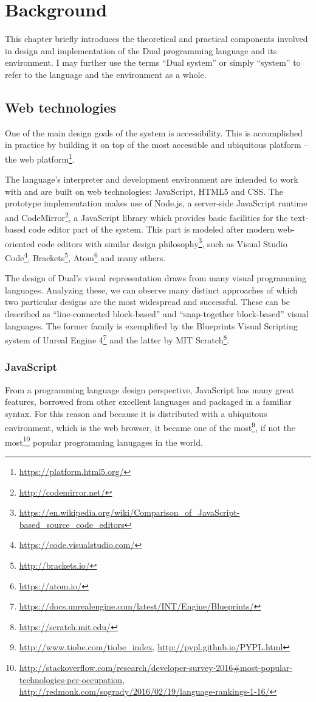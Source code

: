 \chapter{Background}\label{chap:background}
This chapter briefly introduces the theoretical and practical components
involved in design and implementation of the Dual programming language and its
environment. I may further use the terms ``Dual system'' or simply ``system'' to
refer to the language and the environment as a whole.

\section{Web technologies}
One of the main design goals of the system is accessibility. This is
accomplished in practice by building it on top of the most accessible and
ubiquitous platform -- the web
platform\footnote{\url{https://platform.html5.org/}}.

The language's interpreter and development environment are intended to work with
and are built on web technologies: JavaScript, HTML5 and CSS. The prototype
implementation makes use of Node.js, a server-side JavaScript runtime and
CodeMirror\footnote{\url{http://codemirror.net/}}, a JavaScript library which
provides basic facilities for the text-based code editor part of the
system. This part is modeled after modern web-oriented code editors with similar
design
philosophy\footnote{\url{https://en.wikipedia.org/wiki/Comparison_of_JavaScript-based_source_code_editors}},
such as Visual Studio Code\footnote{\url{https://code.visualstudio.com/}},
Brackets\footnote{\url{http://brackets.io/}},
Atom\footnote{\url{https://atom.io/}} and many others.

The design of Dual's visual representation draws from many visual programming
languages. Analyzing these, we can observe many distinct approaches of which two
particular designs are the most widespread and successful. These can be
described as ``line-connected block-based'' and ``snap-together block-based''
visual languages. The former family is exemplified by the Blueprints Visual
Scripting system of Unreal Engine
4\footnote{\url{https://docs.unrealengine.com/latest/INT/Engine/Blueprints/}}
and the latter by MIT Scratch\footnote{\url{https://scratch.mit.edu/}}.

\subsection{JavaScript}
From a programming language design perspective, JavaScript has many great
features, borrowed from other excellent languages and packaged in a familiar
syntax. For this reason and because it is distributed with a ubiquitous
environment, which is the web browser, it became one of the
most\footnote{\url{http://www.tiobe.com/tiobe_index},
  \url{http://pypl.github.io/PYPL.html}}, if not the
most\footnote{\url{http://stackoverflow.com/research/developer-survey-2016\#most-popular-technologies-per-occupation},
  \url{http://redmonk.com/sogrady/2016/02/19/language-rankings-1-16/}} popular
programming lanugages in the world.

